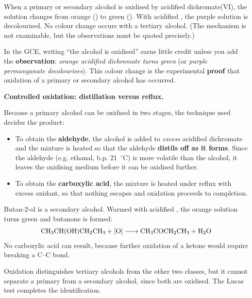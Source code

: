 \documentclass[11pt]{article}
\newcommand{\cle}[1]{{\popxbold\color{popdark}#1}}
\newcounter{popsec}
\newcounter{popsub}
\newcommand{\courssub}[1]{%
  \stepcounter{popsub}%
  \par\vspace{9pt}\noindent{\popxbold\fontsize{11.5}{13}\selectfont\color{popink}{\color{poporange}\thepopsec.\thepopsub}\hspace{6pt}#1}\par\nopagebreak\vspace{4pt}
}
\begin{document}
\begin{propriete}
When a primary or secondary alcohol is oxidised by acidified dichromate(VI), the solution changes from \cle{orange} () to \cle{green} (). With acidified , the purple solution is decolourised. No colour change occurs with a tertiary alcohol. (The mechanism is not examinable, but the observations must be quoted precisely.)
\end{propriete}

\begin{attention}
In the GCE, writing ``the alcohol is oxidised'' earns little credit unless you add the \textbf{observation}: \emph{orange acidified dichromate turns green} (or \emph{purple permanganate decolourises}). This colour change is the experimental \textbf{proof} that oxidation of a primary or secondary alcohol has occurred.
\end{attention}

\textbf{Controlled oxidation: distillation versus reflux.}\par
Because a primary alcohol can be oxidised in two stages, the technique used decides the product:

\begin{itemize}
\item To obtain the \textbf{aldehyde}, the alcohol is added to \emph{excess} acidified dichromate and the mixture is heated so that the aldehyde \textbf{distils off as it forms}. Since the aldehyde (e.g. ethanal, b.p. \SI{21}{\ensuremath{{}^{\circ}\mathrm{C}}}) is more volatile than the alcohol, it leaves the oxidising medium before it can be oxidised further.
\item To obtain the \textbf{carboxylic acid}, the mixture is heated under \cle{reflux} with excess oxidant, so that nothing escapes and oxidation proceeds to completion.
\end{itemize}

\begin{exemplebox}
Butan-2-ol is a secondary alcohol. Warmed with acidified , the orange solution turns green and butanone is formed:
\[ \ce{CH3CH(OH)CH2CH3 + [O] -> CH3COCH2CH3 + H2O} \]
No carboxylic acid can result, because further oxidation of a ketone would require breaking a C--C bond.
\end{exemplebox}

\courssub{The Lucas Test}

Oxidation distinguishes tertiary alcohols from the other two classes, but it cannot separate a primary from a secondary alcohol, since both are oxidised. The \cle{Lucas test} completes the identification.
\end{document}
